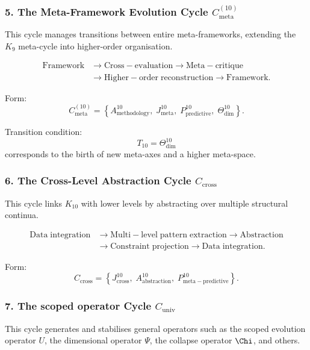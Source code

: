 \subsubsection{5. The Meta-Framework Evolution Cycle $C_{\mathrm{meta}}^{(10)}$}

This cycle manages transitions between entire meta-frameworks, extending the
$K_9$ meta-cycle into higher-order organisation.

\[
  \begin{aligned}
  \mathrm{Framework}
  &\to \mathrm{Cross\!-\!evaluation}
  \to \mathrm{Meta\!-\!critique}\\
  &\to \mathrm{Higher\!-\!order\;reconstruction}
  \to \mathrm{Framework}.
  \end{aligned}
\]

Form:
\[
  C_{\mathrm{meta}}^{(10)}
   =
   \left\{
     A^{10}_{\mathrm{methodology}},\;
     J^{10}_{\mathrm{meta}},\;
     P^{10}_{\mathrm{predictive}},\;
     \Theta^{10}_{\mathrm{dim}}
   \right\}.
\]

Transition condition:
\[
  T_{10} = \Theta^{10}_{\mathrm{dim}}
\]
corresponds to the birth of new meta-axes and a higher meta-space.


\subsubsection{6. The Cross-Level Abstraction Cycle $C_{\mathrm{cross}}$}

This cycle links $K_{10}$ with lower levels by abstracting over multiple
structural continua.

\[
  \begin{aligned}
  \mathrm{Data\;integration}
  &\to \mathrm{Multi\!-\!level\;pattern\;extraction}
  \to \mathrm{Abstraction}\\
  &\to \mathrm{Constraint\;projection}
  \to \mathrm{Data\;integration}.
  \end{aligned}
\]

Form:
\[
  C_{\mathrm{cross}}
  =
  \left\{
    J^{10}_{\mathrm{cross}},\;
    A^{10}_{\mathrm{abstraction}},\;
    P^{10}_{\mathrm{meta\!-\!predictive}}
  \right\}.
\]


\subsubsection{7. The scoped operator Cycle $C_{\mathrm{univ}}$}

This cycle generates and stabilises general operators such as the
scoped evolution operator $U$, the dimensional operator $\Psi$, the
collapse operator $\Chi$, and others.

